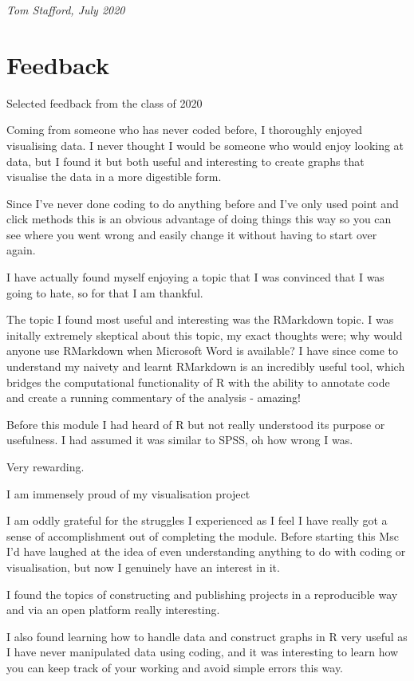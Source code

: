 \documentclass[
]{book}
\begin{document}
\emph{Tom Stafford, July 2020}

\hypertarget{feedback}{%
\section{Feedback}\label{feedback}}

Selected feedback from the class of 2020

Coming from someone who has never coded before, I thoroughly enjoyed visualising data. I never thought I would be someone who would enjoy looking at data, but I found it but both useful and interesting to create graphs that visualise the data in a more digestible form.

Since I've never done coding to do anything before and I've only used point and click methods this is an obvious advantage of doing things this way so you can see where you went wrong and easily change it without having to start over again.

I have actually found myself enjoying a topic that I was convinced that I was going to hate, so for that I am thankful.

The topic I found most useful and interesting was the RMarkdown topic. I was initally extremely skeptical about this topic, my exact thoughts were; why would anyone use RMarkdown when Microsoft Word is available? I have since come to understand my naivety and learnt RMarkdown is an incredibly useful tool, which bridges the computational functionality of R with the ability to annotate code and create a running commentary of the analysis - amazing!

Before this module I had heard of R but not really understood its purpose or usefulness. I had assumed it was similar to SPSS, oh how wrong I was.

Very rewarding.

I am immensely proud of my visualisation project

I am oddly grateful for the struggles I experienced as I feel I have really got a sense of accomplishment out of completing the module. Before starting this Msc I'd have laughed at the idea of even understanding anything to do with coding or visualisation, but now I genuinely have an interest in it.

I found the topics of constructing and publishing projects in a reproducible way and via an open platform really interesting.

I also found learning how to handle data and construct graphs in R very useful as I have never manipulated data using coding, and it was interesting to learn how you can keep track of your working and avoid simple errors this way.
\end{document}
